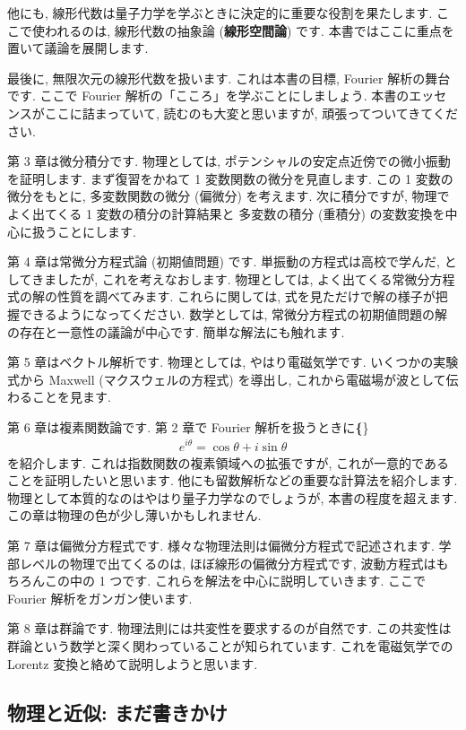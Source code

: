 \documentclass[openany, a4paper, oneside]{jsbook}
\begin{document}
他にも, 線形代数は量子力学を学ぶときに決定的に重要な役割を果たします.
ここで使われるのは, 線形代数の抽象論 (\textbf{線形空間論}) です.
本書ではここに重点を置いて議論を展開します.

最後に, 無限次元の線形代数を扱います.
これは本書の目標, Fourier 解析の舞台です.
ここで Fourier 解析の「こころ」を学ぶことにしましょう.
本書のエッセンスがここに詰まっていて, 読むのも大変と思いますが,
頑張ってついてきてください.

第 3 章は微分積分です.
物理としては, ポテンシャルの安定点近傍での微小振動を証明します.
まず復習をかねて 1 変数関数の微分を見直します.
この 1 変数の微分をもとに, 多変数関数の微分 (偏微分) を考えます.
次に積分ですが, 物理でよく出てくる 1 変数の積分の計算結果と
多変数の積分 (重積分) の変数変換を中心に扱うことにします.

第 4 章は常微分方程式論 (初期値問題) です.
単振動の方程式は高校で学んだ, としてきましたが, これを考えなおします.
物理としては, よく出てくる常微分方程式の解の性質を調べてみます.
これらに関しては, 式を見ただけで解の様子が把握できるようになってください.
数学としては, 常微分方程式の初期値問題の解の存在と一意性の議論が中心です.
簡単な解法にも触れます.

第 5 章はベクトル解析です.
物理としては, やはり電磁気学です.
いくつかの実験式から Maxwell (マクスウェルの方程式) を導出し,
これから電磁場が波として伝わることを見ます.

第 6 章は複素関数論です.
第 2 章で Fourier 解析を扱うときに\textbf\{\}
\begin{align}
    e^{i \theta}
    =
    \cos \theta + i \sin \theta
\end{align}
を紹介します.
これは指数関数の複素領域への拡張ですが, これが一意的であることを証明したいと思います.
他にも留数解析などの重要な計算法を紹介します.
物理として本質的なのはやはり量子力学なのでしょうが, 本書の程度を超えます.
この章は物理の色が少し薄いかもしれません.

第 7 章は偏微分方程式です.
様々な物理法則は偏微分方程式で記述されます.
学部レベルの物理で出てくるのは, ほぼ線形の偏微分方程式です,
波動方程式はもちろんこの中の 1 つです.
これらを解法を中心に説明していきます.
ここで Fourier 解析をガンガン使います.

第 8 章は群論です.
物理法則には共変性を要求するのが自然です.
この共変性は群論という数学と深く関わっていることが知られています.
これを電磁気学での Lorentz 変換と絡めて説明しようと思います.
\subsection{物理と近似: まだ書きかけ}
\end{document}
